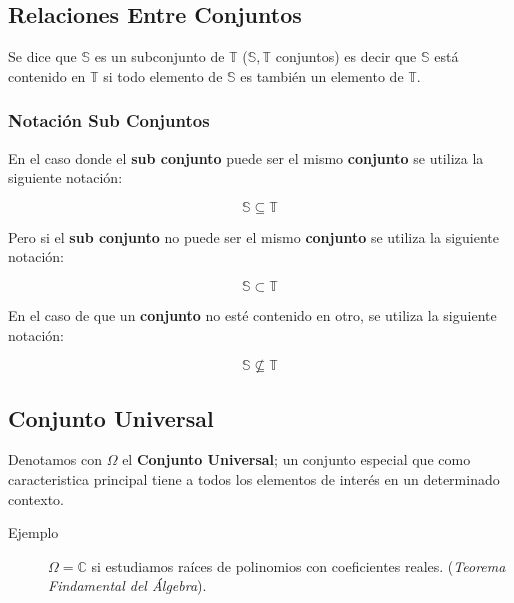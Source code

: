 \documentclass[a4paper,dvipsnames]{book}
\begin{document}
    \subsection{Relaciones Entre Conjuntos}


    Se dice que $ \mathbb S $ es un subconjunto de $ \mathbb T $ ($ \mathbb
    S,\mathbb T $ conjuntos) es decir que $ \mathbb S $ está contenido en $
    \mathbb T $ si todo elemento de $ \mathbb S $ es también un elemento de $
    \mathbb T $.

    \subsubsection{Notación Sub Conjuntos}


    En el caso donde el \textbf{sub conjunto} puede ser el mismo
    \textbf{conjunto} se utiliza la siguiente notación:

    \begin{equation*}

        \mathbb S\subseteq \mathbb T
    \end{equation*}

    Pero si el \textbf{sub conjunto} no puede ser el mismo \textbf{conjunto} se
    utiliza la siguiente notación:

    \begin{equation*}

        \mathbb S\subset \mathbb T
    \end{equation*}

    En el caso de que un \textbf{conjunto} no esté contenido en otro, se
    utiliza la siguiente notación:

    \begin{equation*}

        \mathbb S\not\subseteq \mathbb T
    \end{equation*}

    \subsection{Conjunto Universal}


    Denotamos con $ \Omega $ el \textbf{Conjunto Universal}; un conjunto
    especial que como caracteristica principal tiene a todos los elementos de
    interés en un determinado contexto.

    \begin{description}
        \item[Ejemplo] $\Omega=\mathbb C$ si estudiamos raíces de polinomios
            con coeficientes reales. (\textit{Teorema Findamental del
            Álgebra}).
    \end{description}
\end{document}
